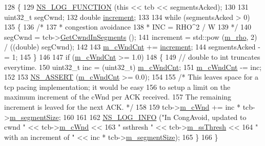 \begin{DoxyCode}
128 \{
129   \hyperlink{log-macros-disabled_8h_a90b90d5bad1f39cb1b64923ea94c0761}{NS\_LOG\_FUNCTION} (\textcolor{keyword}{this} << tcb << segmentsAcked);
130 
131   uint32\_t segCwnd;
132   \textcolor{keywordtype}{double} \hyperlink{mmwave-amc-test2_8cc_ac504dff76b24ab9f15536c51aec9fbbb}{increment};
133 
134   \textcolor{keywordflow}{while} (segmentsAcked > 0)
135     \{
136       \textcolor{comment}{/*}
137 \textcolor{comment}{       * congestion avoidance}
138 \textcolor{comment}{       * INC = RHO^2 / W}
139 \textcolor{comment}{       */}
140       segCwnd = tcb->\hyperlink{classns3_1_1TcpSocketState_ab6dfe309ca53fd3207dcafede75ad12d}{GetCwndInSegments} ();
141       increment = std::pow (\hyperlink{classns3_1_1TcpHybla_a89505ef8588ef3cbe7d19422cd8e1c78}{m\_rho}, 2) / ((double) segCwnd);
142 
143       \hyperlink{classns3_1_1TcpHybla_ac5ab21faceb85b6e6038419fd8392d54}{m\_cWndCnt} += \hyperlink{mmwave-amc-test2_8cc_ac504dff76b24ab9f15536c51aec9fbbb}{increment};
144       segmentsAcked -= 1;
145     \}
146 
147   \textcolor{keywordflow}{if} (\hyperlink{classns3_1_1TcpHybla_ac5ab21faceb85b6e6038419fd8392d54}{m\_cWndCnt} >= 1.0)
148     \{
149       \textcolor{comment}{// double to int truncates everytime.}
150       uint32\_t inc = (uint32\_t) \hyperlink{classns3_1_1TcpHybla_ac5ab21faceb85b6e6038419fd8392d54}{m\_cWndCnt};
151       \hyperlink{classns3_1_1TcpHybla_ac5ab21faceb85b6e6038419fd8392d54}{m\_cWndCnt} -= inc;
152 
153       \hyperlink{assert_8h_a6dccdb0de9b252f60088ce281c49d052}{NS\_ASSERT} (\hyperlink{classns3_1_1TcpHybla_ac5ab21faceb85b6e6038419fd8392d54}{m\_cWndCnt} >= 0.0);
154 
155       \textcolor{comment}{/* This leaves space for a tcp pacing implementation; it would be easy}
156 \textcolor{comment}{         to setup a limit on the maximum increment of the cWnd per ACK received.}
157 \textcolor{comment}{         The remaining increment is leaved for the next ACK. */}
158 
159       tcb->\hyperlink{classns3_1_1TcpSocketState_a7cd3d2156a483c1db436097477a0fd7f}{m\_cWnd} += inc * tcb->\hyperlink{classns3_1_1TcpSocketState_a079872f7b0099ef5f3cab4ff47bd2edd}{m\_segmentSize};
160 
161 
162       \hyperlink{group__logging_gafbd73ee2cf9f26b319f49086d8e860fb}{NS\_LOG\_INFO} (\textcolor{stringliteral}{"In CongAvoid, updated to cwnd "} << tcb->\hyperlink{classns3_1_1TcpSocketState_a7cd3d2156a483c1db436097477a0fd7f}{m\_cWnd} <<
163                    \textcolor{stringliteral}{" ssthresh "} << tcb->\hyperlink{classns3_1_1TcpSocketState_aec003b6dba9d269bfb1036c7652ffbd6}{m\_ssThresh} <<
164                    \textcolor{stringliteral}{" with an increment of "} << inc * tcb->\hyperlink{classns3_1_1TcpSocketState_a079872f7b0099ef5f3cab4ff47bd2edd}{m\_segmentSize});
165     \}
166 \}
\end{DoxyCode}


